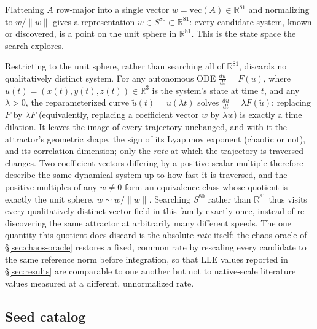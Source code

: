 \documentclass[11pt]{article}
\begin{document}
Flattening $A$ row-major into a single vector $w = \mathrm{vec}(A) \in
\mathbb{R}^{81}$ and normalizing to $w / \lVert w \rVert$ gives a
representation $w \in S^{80} \subset \mathbb{R}^{81}$: every candidate
system, known or discovered, is a point on the unit sphere in
$\mathbb{R}^{81}$. This is the state space the search explores.

Restricting to the unit sphere, rather than searching all of
$\mathbb{R}^{81}$, discards no qualitatively distinct system. For any
autonomous ODE $\frac{du}{dt} = F(u)$, where $u(t) = (x(t), y(t), z(t)) \in
\mathbb{R}^3$ is the system's state at time $t$, and any $\lambda > 0$, the reparameterized
curve $\tilde{u}(t) = u(\lambda t)$ solves $\frac{d\tilde{u}}{dt} = \lambda
F(\tilde{u})$: replacing $F$ by $\lambda F$ (equivalently, replacing a
coefficient vector $w$ by $\lambda w$) is exactly a time dilation. It
leaves the image of every trajectory unchanged, and with it the attractor's
geometric shape, the sign of its Lyapunov exponent (chaotic or not), and its
correlation dimension; only the \emph{rate} at which the trajectory is
traversed changes. Two coefficient vectors differing by a positive scalar
multiple therefore describe the same dynamical system up to how fast it is
traversed, and the positive multiples of any $w \neq 0$ form an equivalence
class whose quotient is exactly the unit sphere, $w \sim w/\lVert w \rVert$.
Searching $S^{80}$ rather than $\mathbb{R}^{81}$ thus visits every
qualitatively distinct vector field in this family exactly once, instead of
re-discovering the same attractor at arbitrarily many different speeds. The
one quantity this quotient does discard is the absolute \emph{rate} itself:
the chaos oracle of \S\ref{sec:chaos-oracle} restores a fixed, common rate by
rescaling every candidate to the same reference norm before integration, so
that LLE values reported in \S\ref{sec:results} are comparable to one
another but not to native-scale literature values measured at a different,
unnormalized rate.

\subsection{Seed catalog}
\label{sec:seeds}
\end{document}
